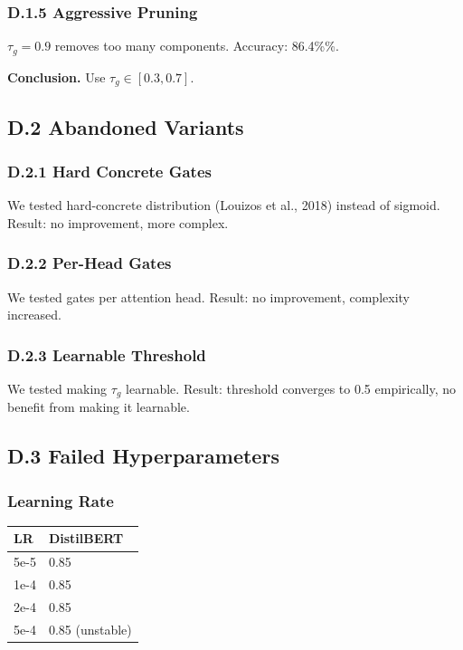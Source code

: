 \subsubsection{D.1.5 Aggressive Pruning}

$\tau_g = 0.9$ removes too many components. Accuracy: 86.4\%\%.

\textbf{Conclusion.} Use $\tau_g \in [0.3, 0.7]$.

\subsection{D.2 Abandoned Variants}

\subsubsection{D.2.1 Hard Concrete Gates}

We tested hard-concrete distribution (Louizos et al., 2018) instead of 
sigmoid. Result: no improvement, more complex.

\subsubsection{D.2.2 Per-Head Gates}

We tested gates per attention head. Result: no improvement, complexity 
increased.

\subsubsection{D.2.3 Learnable Threshold}

We tested making $\tau_g$ learnable. Result: threshold converges to 0.5 
empirically, no benefit from making it learnable.

\subsection{D.3 Failed Hyperparameters}

\subsubsection{Learning Rate}

\begin{table}[H]
\centering
\small
\begin{tabular}{ll}
\toprule
\textbf{LR} & \textbf{DistilBERT} \\
\midrule
5e-5 & 0.85 \\
1e-4 & 0.85 \\
2e-4 & 0.85 \\
5e-4 & 0.85 (unstable) \\
\bottomrule
\end{tabular}
\end{table}


